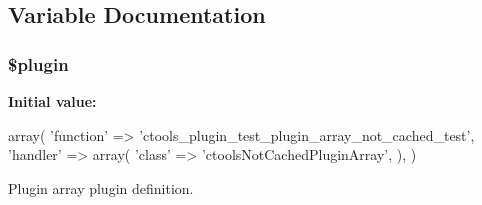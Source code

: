 \subsection{Variable Documentation}
\hypertarget{not__cached_2plugin__array_8inc_ada8a7130088351710bb02ed622d6bf65}{
\subsubsection[{\$plugin}]{\setlength{\rightskip}{0pt plus 5cm}\$plugin}}
\label{not__cached_2plugin__array_8inc_ada8a7130088351710bb02ed622d6bf65}
{\bfseries Initial value:}
\begin{DoxyCode}
 array(
  'function' => 'ctools_plugin_test_plugin_array_not_cached_test',
  'handler' => array(
    'class' => 'ctoolsNotCachedPluginArray',
  ),
)
\end{DoxyCode}
Plugin array plugin definition. 